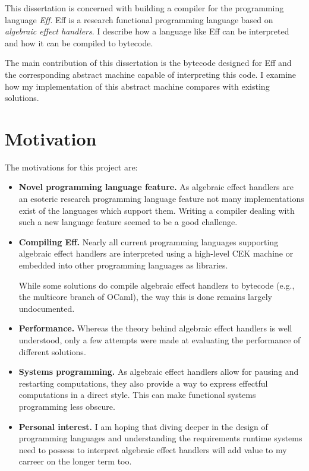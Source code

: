 \documentclass[class=article,crop=false,11pt]{standalone}
\begin{document}
This dissertation is concerned with building a compiler for the programming 
language \emph{Eff}. Eff is a research functional programming language based 
on \emph{algebraic effect handlers}. I describe how a language like Eff can 
be interpreted and how it can be compiled to bytecode.

The main contribution of this dissertation is the bytecode designed for Eff
and the corresponding abstract machine capable of interpreting this code. I 
examine how my implementation of this abstract machine compares with 
existing solutions.

\section{Motivation}
The motivations for this project are:
\begin{itemize}
\item \textbf{Novel programming language feature.} 
As algebraic effect handlers are an esoteric research programming language
feature not many implementations exist of the languages which support them.
Writing a compiler dealing with such a new language feature seemed to be a
good challenge.

\item \textbf{Compiling Eff.}
Nearly all current programming languages supporting algebraic effect handlers
are interpreted using a high-level CEK machine or embedded into other
programming languages as libraries.

While some solutions do compile algebraic effect handlers to bytecode (e.g.,
the multicore branch of OCaml), the way this is done remains largely
undocumented.

\item \textbf{Performance.}
Whereas the theory behind algebraic effect handlers is well understood, only a
few attempts were made at evaluating the performance of different solutions.

\item \textbf{Systems programming.}
As algebraic effect handlers allow for pausing and restarting computations, they
also provide a way to express effectful computations in a direct style.
This can make functional systems programming less obscure.

\item \textbf{Personal interest.}
I am hoping that diving deeper in the design of programming languages and
understanding the requirements runtime systems need to possess to interpret
algebraic effect handlers  will add value to my carreer on the longer term too.

\end{itemize}
\end{document}
